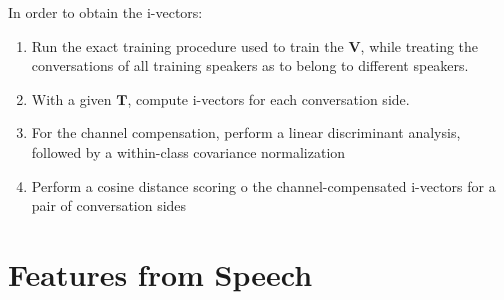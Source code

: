 In order to obtain the i-vectors:
\begin{enumerate}
    \item Run the exact training procedure used to train the $\bm{V}$, while treating the conversations of all training speakers as to belong to different speakers.
    \item With a given $\bm{T}$, compute i-vectors for each conversation side.
    \item For the channel compensation, perform a linear discriminant analysis, followed by a within-class covariance normalization
    \item Perform a cosine distance scoring o the channel-compensated i-vectors for a pair of conversation sides
\end{enumerate}

\section{Features from Speech}
